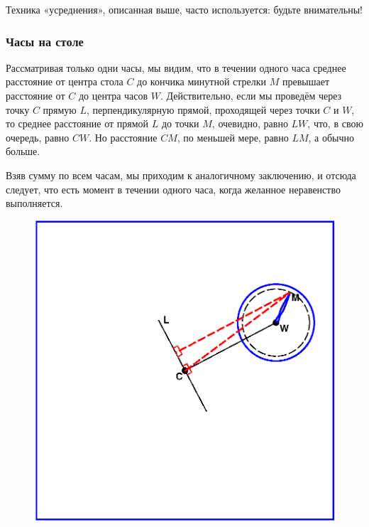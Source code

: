 
Техника «усреднения», описанная выше, часто используется: будьте внимательны!

\subsubsection*{Часы на столе} %

Рассматривая только одни часы, 
мы видим, что в течении одного часа среднее расстояние от центра стола $C$ до кончика минутной стрелки $M$ превышает расстояние от $C$ до центра часов $W$.
Действительно, если мы проведём через точку $C$ прямую $L$, перпендикулярную прямой, проходящей через точки $C$ и $W$, 
то среднее расстояние от прямой $L$ до точки $M$, очевидно, равно $LW$, 
что, в свою очередь, равно $CW$.
Но расстояние $CM$, по меньшей мере, равно $LM$, а обычно больше.

Взяв сумму по всем часам, мы приходим к аналогичному заключению, и отсюда следует, что есть момент в течении одного часа, когда желанное неравенство выполняется.\heart

\begin{figure}[h!]
\centering
\includegraphics[scale=0.9]{Figs/Insight/watch}
\end{figure}

